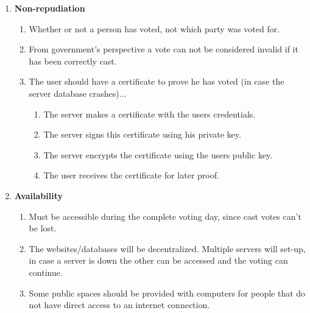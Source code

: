 \begin{enumerate}
    \item \textbf{Non-repudiation}
    \begin{enumerate}
        \item Whether or not a person has voted, not which party was voted for.
        \item From government's perspective a vote can not be considered invalid if it has been correctly cast.
        \item The user should have a certificate to prove he has voted (in case the server database crashes)...
        \begin{enumerate}
            \item The server makes a certificate with the users credentials.
            \item The server signs this certificate using his private key.
            \item The server encrypts the certificate using the users public key.
            \item The user receives the certificate for later proof.
        \end{enumerate}
    \end{enumerate}
    
    \item \textbf{Availability}
    \begin{enumerate}
        \item Must be accessible during the complete voting day, since cast votes can't be lost.
        \item The websites/databases will be decentralized. Multiple servers will set-up, in case a server is down the other can be accessed and the voting can continue. 
        \item Some public spaces should be provided with computers for people that do not have direct access to an internet connection.
    \end{enumerate}
\end{enumerate}